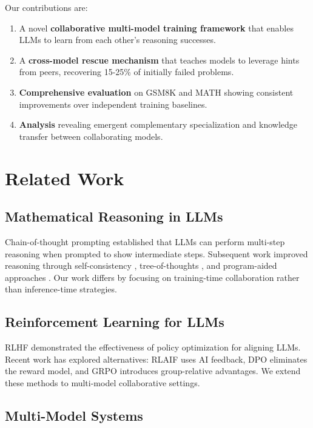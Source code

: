 \documentclass[11pt]{article}
\begin{document}
Our contributions are:
\begin{enumerate}
    \item A novel \textbf{collaborative multi-model training framework} that enables LLMs to learn from each other's reasoning successes.
    \item A \textbf{cross-model rescue mechanism} that teaches models to leverage hints from peers, recovering 15-25\% of initially failed problems.
    \item \textbf{Comprehensive evaluation} on GSM8K and MATH showing consistent improvements over independent training baselines.
    \item \textbf{Analysis} revealing emergent complementary specialization and knowledge transfer between collaborating models.
\end{enumerate}

\section{Related Work}

\subsection{Mathematical Reasoning in LLMs}

Chain-of-thought prompting \citep{wei2022chain} established that LLMs can perform multi-step reasoning when prompted to show intermediate steps. Subsequent work improved reasoning through self-consistency \citep{wang2023selfconsistency}, tree-of-thoughts \citep{yao2023tree}, and program-aided approaches \citep{gao2023pal, chen2023program}. Our work differs by focusing on training-time collaboration rather than inference-time strategies.

\subsection{Reinforcement Learning for LLMs}

RLHF \citep{ouyang2022training} demonstrated the effectiveness of policy optimization for aligning LLMs. Recent work has explored alternatives: RLAIF \citep{lee2023rlaif} uses AI feedback, DPO \citep{rafailov2023direct} eliminates the reward model, and GRPO \citep{shao2024deepseekmath} introduces group-relative advantages. We extend these methods to multi-model collaborative settings.

\subsection{Multi-Model Systems}
\end{document}
